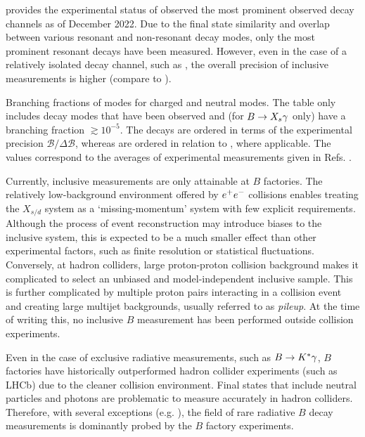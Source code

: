  provides the experimental status of observed the most prominent observed \BtoXsdgamma decay channels as of December 2022.
Due to the final state similarity and overlap between various resonant and non-resonant decay modes, only the most prominent resonant decays have been measured.
However, even in the case of a relatively isolated decay channel, such as \BtoKstargamma, the overall precision of inclusive measurements is higher (compare to ).

{\renewcommand{\arraystretch}{1.2}
\begin{table}[!htbp]
    \centering
    \caption{\label{tab:btosgamma_bfs} 
    Branching fractions of \BtoXsgamma modes for charged and neutral modes.
    The table only includes decay modes that have been observed and (for $\BtoXsgamma$ only) have a branching fraction $\gtrsim10^{-5}$.
    The \Bp decays are ordered in terms of the experimental precision $\mathcal{B}/\Delta\mathcal{B}$, whereas \Bz are ordered in relation to \Bp, where applicable.
    The values correspond to the averages of experimental measurements given in Refs. \cite{Amhis:2022mac,Workman:2022ynf}.
    }
    
\end{table}
}

Currently, inclusive measurements are only attainable at $B$ factories.
The relatively low-background environment offered by $e^+e^-$ collisions enables treating the $X_{s/d}$ system as a `missing-momentum' system with few explicit requirements.
Although the process of event reconstruction may introduce biases to the inclusive system, this is expected to be a much smaller effect than other experimental factors, such as finite resolution or statistical fluctuations.
Conversely, at hadron colliders,
large proton-proton collision background makes it complicated to select an unbiased and model-independent inclusive sample.
This is further complicated by multiple proton pairs interacting in a collision event and creating large multijet backgrounds, usually referred to as \textit{pileup}.
At the time of writing this, no inclusive $B$ measurement has been performed outside \epem collision experiments.

Even in the case of exclusive radiative measurements, such as $B\rightarrow K^*\gamma$, $B$ factories have historically outperformed hadron collider experiments (such as LHCb) due to the cleaner \epem collision environment.
Final states that include neutral particles and photons are problematic to measure accurately in hadron colliders.
Therefore, with several exceptions (e.g. \cite{Bellee:2019qbt}), the field of rare radiative $B$ decay measurements is dominantly probed by the $B$ factory experiments.



